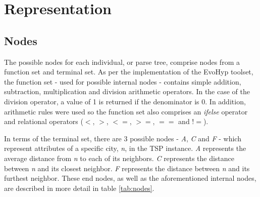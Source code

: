 \section{Representation}

\subsection{Nodes}
The possible nodes for each individual, or parse tree, comprise nodes from a function set and terminal set. As per the implementation of the EvoHyp \cite{pillay2017evohyp} toolset, the function set - used for possible internal nodes - contains simple addition, subtraction, multiplication and division arithmetic operators. In the case of the division operator, a value of 1 is returned if the denominator is 0. In addition, arithmetic rules were used so the function set also comprises an \emph{ifelse} operator and
relational operators ($<$, $>$, $<=$, $>=$, $==$ and $!=$).

In terms of the terminal set, there are 3 possible nodes - \emph{A}, \emph{C} and \emph{F} - which represent attributes of a specific city, \emph{n}, in the TSP instance. \emph{A} represents the average distance from \emph{n} to each of its neighbors. \emph{C} represents the distance between \emph{n} and its closest neighbor. \emph{F} represents the distance between \emph{n} and its furthest neighbor. These end nodes, as well as the aforementioned internal nodes, are described in more detail in table \ref{tab:nodes}.

